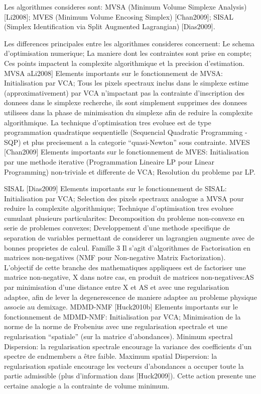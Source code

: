 Les algorithmes consideres sont: MVSA (Minimum Volume Simplexe
Analysis) [Li2008]; MVES (Minimum Volume Encosing Simplex)
[Chan2009]; SISAL (Simplex Identification via Split Augmented
Lagrangian) [Dias2009]. 

Les differences principales entre les algorithmes consideres
concernent: 
Le schema d'optimisation numerique; 
La maniere dont les
contraintes sont prise en compte; 
Ces points impactent la complexite
algorithmique et la precision d'estimation.  MVSA aLi2008] Elements
  importants sur le fonctionnement de MVSA: Initialisation par VCA;
  Tous les pixels spectraux inclus dans le simplexe estime
  (approximativement) par VCA n'impactant pas la contrainte
  d'inscription des donnees dans le simplexe recherche, ils sont
  simplement supprimes des donnees utilisees dans la phase de
  minimisation du simplexe afin de reduire la complexite
  algorithmique.  La technique d'optimisation tres evoluee est de type
  programmation quadratique sequentielle (Sequencial Quadratic
  Programming - SQP) et plus precisement a la categorie
  ``quasi-Newton'' sous contrainte.  MVES [Chan2009] Elements
  importants sur le fonctionnement de MVES: Initialisation par une
  methode iterative (Programmation Lineaire LP pour Linear
  Programming) non-triviale et differente de VCA; Resolution du
  probleme par LP.

  SISAL [Dias2009]
Elements importants sur le fonctionnement de SISAL: Initialisation
par VCA; 
Selection des pixels spectraux analogue a MVSA pour reduire
la complexite algorithmique; 
Technique d'optimisation tres evoluee
cumulant plusieurs particularites: 
Decomposition du probleme
non-convexe en serie de problemes convexes; 
Developpement d'une
methode specifique de separation de variables permettant de considerer
un lagrangien augmente avec de bonnes proprietes de calcul.  
Famille 3
Il s'agit d'algorithmes de Factorisation en matrices non-negatives
(NMF pour Non-negative Matrix Factorization). L'objectif de cette
branche des mathematiques appliquees est de factoriser une matrice
non-negative, X dans notre cas, en produit de matrices
non-negatives:AS par minimisation d'une distance entre X et AS et
avec une regularisation adaptee, afin de lever la degenerescence de
maniere adaptee au probleme physique associe au demixage.  MDMD-NMF
[Huck2010b] Elements importants sur le fonctionnement de MDMD-NMF:
Initialisation par VCA; 
Minimisation de la norme de la norme de
Frobenius avec une regularisation spectrale et une regularisation
``spatiale'' (sur la matrice d'abondances).  
Minimum spectral
Dispersion: la regularisation spectrale encourage la variance des
coefficients d'un spectre de endmembers a être faible.  Maximum
spatial Dispersion: la regularisation spatiale encourage les vecteurs
d'abondances a occuper toute la partie admissible (plus d'information
dans [Huck2009]). Cette action presente une certaine analogie a la
contrainte de volume minimum.

